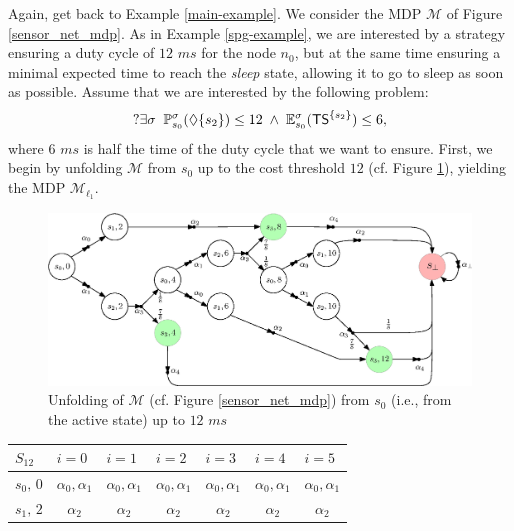 \begin{example}
  Again, get back to Example \ref{main-example}.
  We consider the MDP $\mathcal{M}$ of Figure \ref{sensor_net_mdp}. As in Example \ref{spg-example}, we are interested by a strategy ensuring a duty cycle of $12$ $ms$ for the node $n_0$, but at the same time ensuring a minimal expected time to reach the \textit{sleep} state, allowing it to go to sleep as soon as possible.
  Assume that we are interested by the following \SSPWE{} problem:
  \[
    ?\exists \sigma \; \;  \mathbb{P}^\sigma_{s_0}(\Diamond \{s_2\}) \leq 12 \; \wedge \; \mathbb{E}^\sigma_{s_0}(\text{\sffamily TS}^{\{s_2\}}) \leq 6,
  \]
  where $6$ $ms$ is half the time of the duty cycle that we want to ensure. First, we begin by unfolding $\mathcal{M}$ from $s_0$ up to the cost threshold $12$ (cf. Figure \ref{unfolding-sspwe}), yielding the MDP $\mathcal{M}_{\ell_1}$.
  \begin{figure}[h]
    \centering
    \includegraphics[width=0.9\linewidth]{resources/main-example-unfolding}
    \captionsetup{justification=centering}
    \caption{Unfolding of $\mathcal{M}$ (cf. Figure \ref{sensor_net_mdp}) from $s_0$ (i.e., from the active state) up to $12$ $ms$}
    \label{unfolding-sspwe}
  \end{figure}
  \begin{table}[h]
  \centering
\begin{tabular}{l|cccccc}
$S_{12}$          & \multicolumn{1}{l}{$i=0$} & \multicolumn{1}{l}{$i=1$}                                  & \multicolumn{1}{l}{$i=2$}  & \multicolumn{1}{l}{$i=3$}  & \multicolumn{1}{l}{$i=4$} & \multicolumn{1}{l}{$i=5$} \\ \hline
$s_0, \, 0$  & $\alpha_0, \alpha_1$      & $\alpha_0, \alpha_1$                                       & $\alpha_0, \alpha_1$       & $\alpha_0, \alpha_1$       & $\alpha_0, \alpha_1$      & $\alpha_0, \alpha_1$      \\
$s_1, \, 2$  & $\alpha_2$                & $\alpha_2$                                                 & $\alpha_2$                 & $\alpha_2$                 & $\alpha_2$                & $\alpha_2$                \\

\end{tabular}
\end{table}
\end{example}
